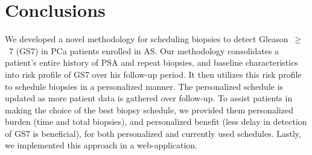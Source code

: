 \section{Conclusions}
We developed a novel methodology for scheduling biopsies to detect Gleason~$\geq$~7 (GS7) in PCa patients enrolled in AS. Our methodology consolidates a patient's entire history of PSA and repeat biopsies, and baseline characteristics into risk profile of GS7 over his follow-up period. It then utilizes this risk profile to schedule biopsies in a personalized manner. The personalized schedule is updated as more patient data is gathered over follow-up. To assist patients in making the choice of the best biopsy schedule, we provided them personalized burden (time and total biopsies), and personalized benefit (less delay in detection of GS7 is beneficial), for both personalized and currently used schedules. Lastly, we implemented this approach in a web-application.